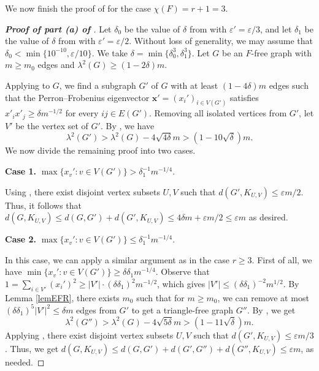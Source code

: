 \documentclass[11pt,a4paper]{article}
\theoremstyle{definition}
\theoremstyle{remark}
\begin{document}
We now finish the proof of  
for the case $\chi (F)=r+1=3$. 


\begin{proof}[{\bf Proof of part (a) of }]
    Let $\delta_0$ be the value of $\delta$ from  with $\varepsilon' = \varepsilon / 3$, and let $\delta_1$ be the value of $\delta$ from  with $\varepsilon' = \varepsilon / 2$. Without loss of generality, we may assume that $\delta_0 < \min\{10^{-10}, \varepsilon/10 \}$. We take $\delta = \min\{\delta_0^3, \delta_1^3\}$. Let $G$ be an $F$-free graph with $m\ge m_0$ edges and $\lambda^2 (G)\ge (1 - 2\delta) m$. 

    Applying  to $G$, we find a subgraph $G'$ of $G$ with at least $(1 - 4 \delta) m$ edges such that the Perron--Frobenius eigenvector $\bm{x}'=(x_i')_{i\in V(G')}$ satisfies $x'_i x'_j \geq \delta m^{-1/2}$ for every  $ij\in E(G')$. Removing all isolated vertices from $G'$, let $V'$ be the vertex set of $G'$. By , we have
    $$\lambda^2(G') > \lambda^2(G) - 4\sqrt{4\delta} m > (1- 10\sqrt{\delta}) m.$$
    We now divide the remaining proof into two cases.

\smallskip
    
    \noindent\textbf{Case 1.} $\max\{x_v' : v\in V(G')\} > \delta_1^{-1} m^{-1/4} $. 
    
    Using , there exist disjoint vertex subsets $U, V$ such that      
    $d(G',K_{U, V}) \le \varepsilon m/2$. 
    Thus, it follows that 
    $d(G,K_{U, V}) \le d(G,G') + d(G' ,K_{U, V}) \le 4 \delta m + \varepsilon m/2 \le \varepsilon m$ as desired. 

\smallskip
    
    \noindent\textbf{Case 2.} $\max\{x_v' : v\in V(G')\} \leq \delta_1^{-1} m^{-1/4}$. 
    
    In this case, we can apply a similar argument as in the case $r \geq 3$. 
    First of all, we have 
    $\min\{x_v': v\in V(G')\} \ge \delta \delta_1 m^{-1/4}$. 
    Observe that $1=\sum_{i\in V'} (x_i')^2\ge |V'| \cdot (\delta \delta_1)^2 m^{-1/2}$, which gives 
     $|V'| \le (\delta \delta_1)^{-2} m^{1/2} $. 
    By Lemma \ref{lemEFR}, there exists $m_0$ such that for $m\ge m_0$, 
    we can remove at most 
    $(\delta \delta_1)^5|V'|^2 \le 
    \delta m$ edges from $G'$ to get a 
    triangle-free graph $G''$. By 
    , we get 
    \[  \lambda^2(G'') > \lambda^2(G) - 
    4\sqrt{5\delta} m > (1- 11\sqrt{\delta})m. \]
    Applying , there exist disjoint vertex subsets $U, V$ such that      
    $d(G',K_{U, V}) \le \varepsilon m/3$. Thus, we get  
    $ d(G,K_{U, V}) \le d(G,G') + d(G',G'') + 
    d(G'',K_{U, V}) \le \varepsilon m$, as needed. 
\end{proof}
\end{document}
